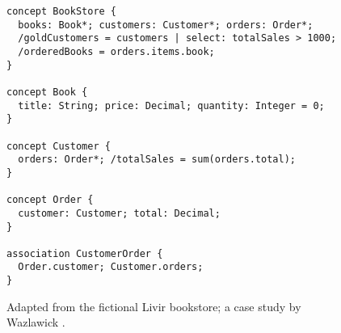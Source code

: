 \begin{figure}
\verbatimfont{\small}
\begin{verbatim}
concept BookStore {
  books: Book*; customers: Customer*; orders: Order*;
  /goldCustomers = customers | select: totalSales > 1000;
  /orderedBooks = orders.items.book;
}

concept Book {
  title: String; price: Decimal; quantity: Integer = 0;
}

concept Customer {
  orders: Order*; /totalSales = sum(orders.total);
}

concept Order {
  customer: Customer; total: Decimal;
}

association CustomerOrder {
  Order.customer; Customer.orders;
}
\end{verbatim}
\caption{Adapted from the fictional Livir bookstore; a case study by Wazlawick \cite{wazlawick}.}
\label{fig:store}
\end{figure}
